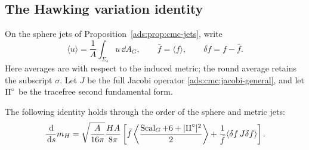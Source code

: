 \subsection{The Hawking variation identity}

On the sphere jets of Proposition~\ref{ads:prop:cmc-jets}, write
\[
 \langle u\rangle=\frac1A\int_{\Sigma_s}u\,\dd A_G,
 \qquad \bar f=\langle f\rangle,\qquad \delta f=f-\bar f.
\]
Here averages are with respect to the induced metric; the round
average retains the subscript \(\sigma\).
Let \(J\) be the full Jacobi operator
\eqref{ads:cmc:jacobi-general}, and let \(\mathrm{II}^\circ\) be the tracefree
second fundamental form.

\begin{lemma}\label{ads:lem:hawking-variation}
The following identity holds through the order of the sphere and
metric jets:
\begin{equation}\label{ads:cmc:hawking-variation}
 \frac{\,\mathrm d}{\,\mathrm d s}m_H
 =\sqrt{\frac A{16\pi}}\frac{HA}{8\pi}
 \left[
 \bar f\left\langle
      \frac{\operatorname{Scal}_G+6+|\mathrm{II}^\circ|^2}{2}
       \right\rangle
 +\frac1{\bar f}\langle\delta f\,J\delta f\rangle
 \right].
\end{equation}
\end{lemma}

